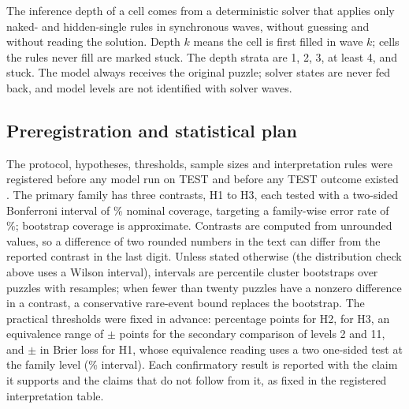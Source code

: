 The inference depth of a cell comes from a deterministic solver that applies only naked- and hidden-single rules in synchronous waves, without guessing and without reading the solution. Depth $k$ means the cell is first filled in wave $k$; cells the rules never fill are marked stuck. The depth strata are 1, 2, 3, at least 4, and stuck. The model always receives the original puzzle; solver states are never fed back, and model levels are not identified with solver waves.

\subsection{Preregistration and statistical plan}
\label{sec:setup-stats}

The protocol, hypotheses, thresholds, sample sizes and interpretation rules were registered before any model run on TEST and before any TEST outcome existed . The primary family has three contrasts, H1 to H3, each tested with a two-sided Bonferroni interval of \% nominal coverage, targeting a family-wise error rate of \%; bootstrap coverage is approximate. Contrasts are computed from unrounded values, so a difference of two rounded numbers in the text can differ from the reported contrast in the last digit. Unless stated otherwise (the distribution check above uses a Wilson interval), intervals are percentile cluster bootstraps over puzzles with  resamples; when fewer than twenty puzzles have a nonzero difference in a contrast, a conservative rare-event bound replaces the bootstrap. The practical thresholds were fixed in advance:  percentage points for H2,  for H3, an equivalence range of $\pm$ points for the secondary comparison of levels 2 and 11, and $\pm$ in Brier loss for H1, whose equivalence reading uses a two one-sided test at the family level (\% interval). Each confirmatory result is reported with the claim it supports and the claims that do not follow from it, as fixed in the registered interpretation table.

